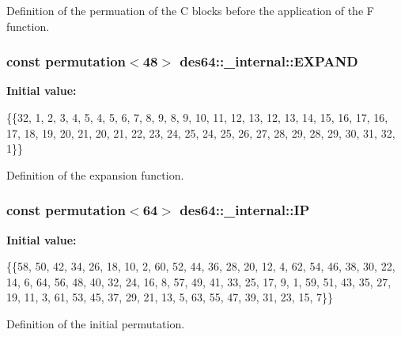 Definition of the permuation of the C blocks before the application of the F function. 

\subsubsection[{\texorpdfstring{E\+X\+P\+A\+ND}{EXPAND}}]{\setlength{\rightskip}{0pt plus 5cm}const {\bf permutation}$<$48$>$ des64\+::\+\_\+internal\+::\+E\+X\+P\+A\+ND}\hypertarget{namespacedes64_1_1__internal_a2ec8d9bfb2f3552b79bbe58d90945b4b}{}\label{namespacedes64_1_1__internal_a2ec8d9bfb2f3552b79bbe58d90945b4b}
{\bfseries Initial value\+:}
\begin{DoxyCode}
\{\{32, 1, 2, 3, 4, 5, 4, 5, 6, 7, 8, 9, 8, 9, 10, 11, 12, 13, 12,
        13, 14, 15, 16, 17, 16, 17, 18, 19, 20, 21, 20, 21, 22, 23, 24,
        25, 24, 25, 26, 27, 28, 29, 28, 29, 30, 31, 32, 1\}\}
\end{DoxyCode}


Definition of the expansion function. 

\subsubsection[{\texorpdfstring{IP}{IP}}]{\setlength{\rightskip}{0pt plus 5cm}const {\bf permutation}$<$64$>$ des64\+::\+\_\+internal\+::\+IP}\hypertarget{namespacedes64_1_1__internal_af57a8d35e765dd0043cc1b7c3d558d38}{}\label{namespacedes64_1_1__internal_af57a8d35e765dd0043cc1b7c3d558d38}
{\bfseries Initial value\+:}
\begin{DoxyCode}
\{\{58, 50, 42, 34, 26, 18, 10, 2, 60, 52, 44, 36, 28, 20, 12, 4,
        62, 54, 46, 38, 30, 22, 14, 6, 64, 56, 48, 40, 32, 24, 16, 8,
        57, 49, 41, 33, 25, 17, 9, 1, 59, 51, 43, 35, 27, 19, 11, 3,
        61, 53, 45, 37, 29, 21, 13, 5, 63, 55, 47, 39, 31, 23, 15, 7\}\}
\end{DoxyCode}


Definition of the initial permutation. 

